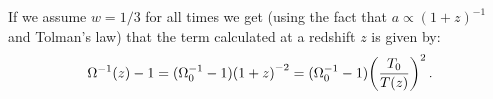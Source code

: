 \documentclass[main.tex]{subfiles}
\begin{document}

If we assume \(w = 1/3\) for all times we get (using the fact that \(a \propto (1+z)^{-1}\) and Tolman's law) that the term calculated at a redshift \(z\) is given by:
%
\begin{align}
  \Omega ^{-1} (z) -1
  = (\Omega_0 ^{-1} -1) \qty(1+z)^{-2}
  = (\Omega_0 ^{-1} -1) \qty(\frac{T_0 }{T(z)})^{2}
\,.
\end{align}
\end{document}

